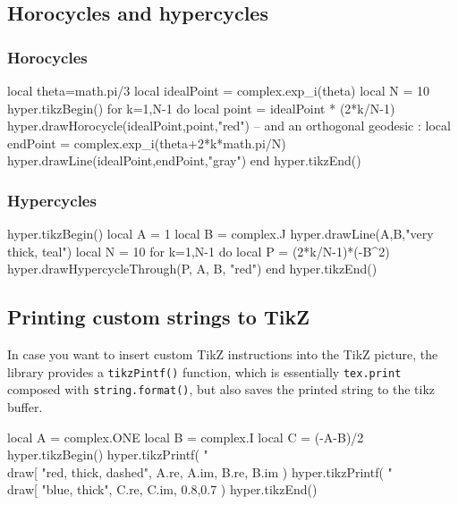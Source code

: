 \documentclass{article}
\begin{document}
\subsection{Horocycles and hypercycles}

\subsubsection{Horocycles}
\begin{codeandresult}
\begin{luacode*}
local theta=math.pi/3
local idealPoint = complex.exp_i(theta)
local N = 10
hyper.tikzBegin()
for k=1,N-1 do
	local point = idealPoint * (2*k/N-1)
	hyper.drawHorocycle(idealPoint,point,"red")
	-- and an orthogonal geodesic : 
	local endPoint = complex.exp_i(theta+2*k*math.pi/N)
	hyper.drawLine(idealPoint,endPoint,"gray")
end
hyper.tikzEnd()
\end{luacode*}
\end{codeandresult}

\subsubsection{Hypercycles}
\begin{codeandresult}
\begin{luacode*}
hyper.tikzBegin()
local A = 1
local B = complex.J
hyper.drawLine(A,B,"very thick, teal")
local N = 10
for k=1,N-1 do
	local P = (2*k/N-1)*(-B^2)
	hyper.drawHypercycleThrough(P, A, B, "red")
end
hyper.tikzEnd()
\end{luacode*}
\end{codeandresult}


\subsection{Printing custom strings to TikZ}
 
 In case you want to insert custom TikZ instructions into the TikZ picture, the library provides a \texttt{tikzPintf()} function, which  is essentially \texttt{tex.print} composed with \texttt{string.format()}, but also saves the printed string to the tikz buffer.

\begin{codeandresult}
\begin{luacode*}
local A = complex.ONE
local B = complex.I
local C = (-A-B)/2
hyper.tikzBegin()
hyper.tikzPrintf(
	"\\draw[%
	"red, thick, dashed", A.re, A.im, B.re, B.im
)
hyper.tikzPrintf(
	"\\draw[%
	"blue, thick", C.re, C.im, 0.8,0.7
) 
hyper.tikzEnd()
\end{luacode*}
\end{codeandresult}
\end{document}
